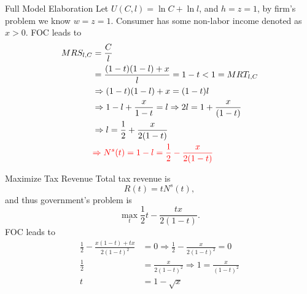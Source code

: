 \documentclass[11pt,aspectratio=43]{beamer}
\newcommand{\red}[1]{\textcolor{red}{#1}}
\theoremstyle{definition}
\begin{document}
\begin{frame}{Full Model Elaboration}
\label{slide:Full_Model_Elaboration}
    Let $ U( C, l ) = \ln C + \ln l $, and $ h = z = 1 $, by firm's problem we know $ w = z = 1 $.
    Consumer has some non-labor income denoted as $ x > 0 $. FOC leads to
    \begin{align*}
        MRS_{l, C}
            & = \frac{C}{l}
        \\
            & = \frac{( 1-t )( 1-l ) + x}{l} = 1 - t < 1 = MRT_{l, C}
        \\
            & \Rightarrow ( 1-t )( 1-l ) + x = ( 1-t )l
        \\
            & \Rightarrow 1-l + \frac{x}{1-t} = l \Rightarrow 2 l = 1 + \frac{x}{(1-t)}
        \\
            & \Rightarrow l = \frac{1}{2} + \frac{x}{2(1-t)}
        \\
            & \red{ \Rightarrow N^{s} ( t ) = 1-l = \frac{1}{2} - \frac{x}{2(1-t)} }
    \end{align*}
\end{frame}

\begin{frame}{Maximize Tax Revenue}
\label{slide:Maximize_Tax_Revenue}
    Total tax revenue is
    \begin{equation*}
       R( t ) = t N^{s}( t )
    ,\end{equation*}
    and thus government's problem is
    \begin{equation*}
       \max_{t} \frac{1}{2}t - \frac{tx}{2(1-t)}
    .\end{equation*}
    FOC leads to
    \begin{align*}
        \frac{1}{2} - \frac{x(1-t) + tx}{2(1-t)^{2}}
            & = 0 \Rightarrow \frac{1}{2} - \frac{x}{2(1-t)^{2}} = 0
        \\
        \frac{1}{2}
            & = \frac{x}{2(1-t)^{2}} \Rightarrow 1 = \frac{x}{(1-t)^{2}}
        \\
        t
            & = 1 - \sqrt{x}
    \end{align*}
\end{frame}
\end{document}
